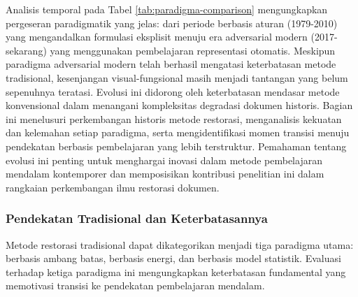 \documentclass[12pt,a4paper]{article}
\begin{document}
Analisis temporal pada Tabel \ref{tab:paradigma-comparison} mengungkapkan pergeseran paradigmatik yang jelas: dari periode berbasis aturan (1979-2010) yang mengandalkan formulasi eksplisit menuju era adversarial modern (2017-sekarang) yang menggunakan pembelajaran representasi otomatis. Meskipun paradigma adversarial modern telah berhasil mengatasi keterbatasan metode tradisional, kesenjangan visual-fungsional masih menjadi tantangan yang belum sepenuhnya teratasi. Evolusi ini didorong oleh keterbatasan mendasar metode konvensional dalam menangani kompleksitas degradasi dokumen historis. Bagian ini menelusuri perkembangan historis metode restorasi, menganalisis kekuatan dan kelemahan setiap paradigma, serta mengidentifikasi momen transisi menuju pendekatan berbasis pembelajaran yang lebih terstruktur. Pemahaman tentang evolusi ini penting untuk menghargai inovasi dalam metode pembelajaran mendalam kontemporer dan memposisikan kontribusi penelitian ini dalam rangkaian perkembangan ilmu restorasi dokumen.

\subsubsection{Pendekatan Tradisional dan Keterbatasannya}
\label{subsubsec:pendekatan-tradisional}

% 

Metode restorasi tradisional dapat dikategorikan menjadi tiga paradigma utama: berbasis ambang batas, berbasis energi, dan berbasis model statistik. Evaluasi terhadap ketiga paradigma ini mengungkapkan keterbatasan fundamental yang memotivasi transisi ke pendekatan pembelajaran mendalam.
\end{document}
